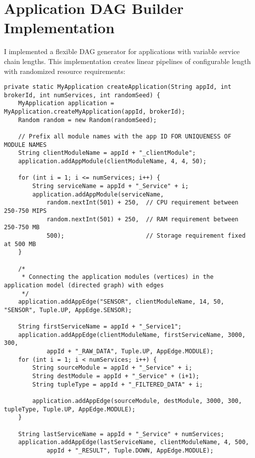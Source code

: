 \chapter{Application DAG Builder Implementation}
\label{appendix:dag-builder}

I implemented a flexible DAG generator for applications with variable service chain lengths. This implementation creates linear pipelines of configurable length with randomized resource requirements:

\begin{verbatim}
private static MyApplication createApplication(String appId, int brokerId, int numServices, int randomSeed) {
    MyApplication application = MyApplication.createMyApplication(appId, brokerId);
    Random random = new Random(randomSeed);

    // Prefix all module names with the app ID FOR UNIQUENESS OF MODULE NAMES
    String clientModuleName = appId + "_clientModule";
    application.addAppModule(clientModuleName, 4, 4, 50);

    for (int i = 1; i <= numServices; i++) {
        String serviceName = appId + "_Service" + i;
        application.addAppModule(serviceName, 
            random.nextInt(501) + 250,  // CPU requirement between 250-750 MIPS
            random.nextInt(501) + 250,  // RAM requirement between 250-750 MB
            500);                       // Storage requirement fixed at 500 MB
    }

    /*
     * Connecting the application modules (vertices) in the application model (directed graph) with edges
     */
    application.addAppEdge("SENSOR", clientModuleName, 14, 50, "SENSOR", Tuple.UP, AppEdge.SENSOR);

    String firstServiceName = appId + "_Service1";
    application.addAppEdge(clientModuleName, firstServiceName, 3000, 300,
            appId + "_RAW_DATA", Tuple.UP, AppEdge.MODULE);
    for (int i = 1; i < numServices; i++) {
        String sourceModule = appId + "_Service" + i;
        String destModule = appId + "_Service" + (i+1);
        String tupleType = appId + "_FILTERED_DATA" + i;

        application.addAppEdge(sourceModule, destModule, 3000, 300, tupleType, Tuple.UP, AppEdge.MODULE);
    }

    String lastServiceName = appId + "_Service" + numServices;
    application.addAppEdge(lastServiceName, clientModuleName, 4, 500,
            appId + "_RESULT", Tuple.DOWN, AppEdge.MODULE);


\end{verbatim}
